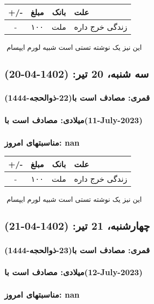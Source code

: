 \documentclass{article}
\newcommand{\rnote}[1]{\marginpar{\textcolor{color}{\StrSubstitute{\##1}{ }{\_}}}}
\newcommand{\myRow}[4]{
    #1 & #2 & #3 & #4 \\ \hline
}
\begin{document}
\begin{tabular}{ | c | c | c | p{5cm} |}
    \hline
    \myRow{ +/- }{مبلغ}{بانک}{علت}
    \myRow{-}{۱۰۰}{ملت}{زندگی خرج داره}
\end{tabular}
\newline
\newline

‌
\rnote{تست}
این نیز یک نوشته تستی است شبیه لورم ایپسام




\newpage
{}
\textcolor{color}{
\section{ سه شنبه، 20 تیر: (1402-04-20) }
\subsubsection*{قمری: مصادف است با(22-ذوالحجه-1444)} 
\subsubsection*{میلادی: مصادف است با(11-July-2023)}
\subsubsection*{مناسبتهای امروز: nan}
}


\begin{tabular}{ | c | c | c | p{5cm} |}
    \hline
    \myRow{ +/- }{مبلغ}{بانک}{علت}
    \myRow{-}{۱۰۰}{ملت}{زندگی خرج داره}
\end{tabular}
\newline
\newline

‌
\rnote{تست}
این نیز یک نوشته تستی است شبیه لورم ایپسام




\newpage
{}
\textcolor{color}{
\section{ چهارشنبه، 21 تیر: (1402-04-21) }
\subsubsection*{قمری: مصادف است با(23-ذوالحجه-1444)} 
\subsubsection*{میلادی: مصادف است با(12-July-2023)}
\subsubsection*{مناسبتهای امروز: nan}
}
\end{document}
